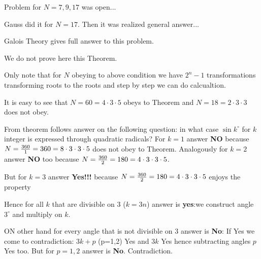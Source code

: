Problem for $N=7,9,17$ was open...

Gauss did it for $N=17$. Then it was realized general answer...

Galois Theory gives full answer to this problem.

We do not prove here this Theorem.

Only note that for $N$ obeying to above
condition we have $2^n-1$ transformations
transforming roots to the roots
and step by step we can do calcualtion.

           It is easy to see that
           $N=60=4\cdot3\cdot 5$ obeys to Theorem
           and $N=18=2\cdot 3\cdot 3$ does not obey.


From theorem follows answer on the following question:
in what case $\sin k^{\circ}$  for $k$ integer is expressed through quadratic radicals?
For $k=1$ answer {\bf NO} because $N={360\over 1}=360=8\cdot 3\cdot 3\cdot 5$
 does not obey
to Theorem. Analogously for $k=2$ answer {\bf NO} too because
$N={360\over 2}=180=4\cdot 3\cdot 3\cdot 5$.

But for $k=3$ answer {\bf Yes!!!}  because
$N={360\over 2}=180=4\cdot 3\cdot 3\cdot 5$
enjoys the property

Hence for all $k$ that are divisible on $3$ ($k=3n$)
answer is {\bf yes}:we construct angle $3^{\circ}$ and multiply on $k$.

ON other hand for every angle that is not divisible on $3$
answer is {\bf No}: If Yes we come to contradiction:
$3k+p$ (p=1,2) Yes and $3k$ Yes hence subtracting angles
$p$ Yes too. But for $p=1,2$ answer is {\bf No}. Contradiction.






\bye
